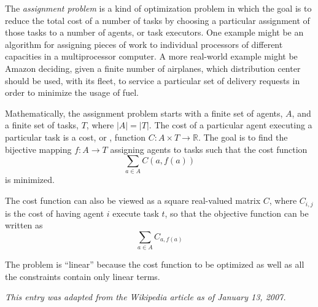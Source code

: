 \documentclass[12pt]{article}
\newcommand{\Reals}{\mathbb{R}}
\begin{document}
The {\em assignment problem} is a kind of optimization problem in which the goal is to reduce the total cost of a number of tasks by choosing a particular assignment of those tasks to a number of agents, or task executors. One example might be an algorithm for assigning pieces of work to individual processors of different capacities in a multiprocessor computer. A more real-world example might be Amazon deciding, given a finite number of airplanes, which distribution center should be used, with its fleet, to service a particular set of delivery requests in order to minimize the usage of fuel.

Mathematically, the assignment problem starts with a finite set of agents, $A$, and a finite set of tasks, $T$, where $\lvert A\rvert=\lvert T\rvert$. The cost of a particular agent executing a particular task is a cost, or , function $C:A\times T\to\Reals$. The goal is to find the bijective mapping $f:A\to T$ assigning agents to tasks such that the cost function
$$\sum_{a \in A}C(a, f(a))$$
is minimized.

The cost function can also be viewed as a square real-valued matrix $C$, where $C_{i,j}$ is the cost of having agent $i$ execute task $t$, so that the objective function can be written as
$$\sum_{a \in A}C_{a,f(a)}$$

The problem is ``linear'' because the cost function to be optimized as well as all the constraints contain only linear terms.

{\it This entry was adapted from the Wikipedia article  as of January 13, 2007.}
\end{document}
